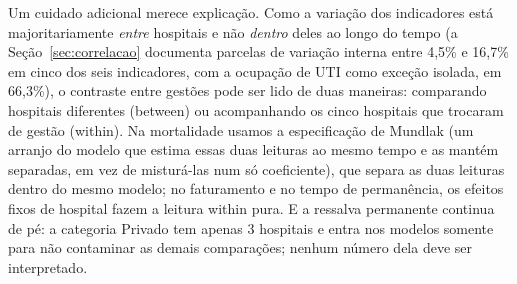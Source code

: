 Um cuidado adicional merece explicação. Como a variação dos indicadores
está majoritariamente \emph{entre} hospitais e não \emph{dentro} deles ao
longo do tempo (a Seção~\ref{sec:correlacao} documenta parcelas de variação
interna entre 4,5\% e 16,7\% em cinco dos seis indicadores, com a ocupação de
UTI como exceção isolada, em 66,3\%), o contraste entre gestões
pode ser lido de duas maneiras: comparando hospitais diferentes
(between) ou acompanhando os cinco hospitais que trocaram de gestão
(within). Na mortalidade usamos a especificação de Mundlak (um
arranjo do modelo que estima essas duas leituras ao mesmo tempo e as
mantém separadas, em vez de misturá-las num só coeficiente), que separa
as duas leituras dentro do mesmo modelo; no faturamento e no tempo de
permanência, os efeitos fixos de hospital fazem a leitura within pura.
E a ressalva permanente continua de pé: a categoria Privado tem apenas
3 hospitais e entra nos modelos somente para não contaminar as demais
comparações; nenhum número dela deve ser interpretado.
